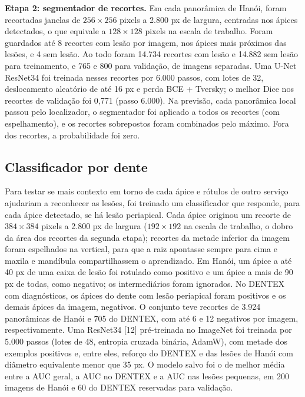 \documentclass[twocolumn]{article}
\begin{document}
\textbf{Etapa 2: segmentador de recortes.} Em cada panorâmica de Hanói, foram recortadas janelas de $256 \times 256$ pixels a 2.800 px de largura, centradas nos ápices detectados, o que equivale a $128 \times 128$ pixels na escala de trabalho. Foram guardados até 8 recortes com lesão por imagem, nos ápices mais próximos das lesões, e 4 sem lesão. Ao todo foram 14.734 recortes com lesão e 14.882 sem lesão para treinamento, e 765 e 800 para validação, de imagens separadas. Uma U-Net ResNet34 foi treinada nesses recortes por 6.000 passos, com lotes de 32, deslocamento aleatório de até 16 px e perda BCE + Tversky; o melhor Dice nos recortes de validação foi 0,771 (passo 6.000). Na previsão, cada panorâmica local passou pelo localizador, o segmentador foi aplicado a todos os recortes (com espelhamento), e os recortes sobrepostos foram combinados pelo máximo. Fora dos recortes, a probabilidade foi zero.

\subsection{Classificador por dente}

Para testar se mais contexto em torno de cada ápice e rótulos de outro serviço ajudariam a reconhecer as lesões, foi treinado um classificador que responde, para cada ápice detectado, se há lesão periapical. Cada ápice originou um recorte de $384 \times 384$ pixels a 2.800 px de largura ($192 \times 192$ na escala de trabalho, o dobro da área dos recortes da segunda etapa); recortes da metade inferior da imagem foram espelhados na vertical, para que a raiz apontasse sempre para cima e maxila e mandíbula compartilhassem o aprendizado. Em Hanói, um ápice a até 40 px de uma caixa de lesão foi rotulado como positivo e um ápice a mais de 90 px de todas, como negativo; os intermediários foram ignorados. No DENTEX com diagnósticos, os ápices do dente com lesão periapical foram positivos e os demais ápices da imagem, negativos. O conjunto teve recortes de 3.924 panorâmicas de Hanói e 705 do DENTEX, com até 6 e 12 negativos por imagem, respectivamente. Uma ResNet34 [12] pré-treinada no ImageNet foi treinada por 5.000 passos (lotes de 48, entropia cruzada binária, AdamW), com metade dos exemplos positivos e, entre eles, reforço do DENTEX e das lesões de Hanói com diâmetro equivalente menor que 35 px. O modelo salvo foi o de melhor média entre a AUC geral, a AUC no DENTEX e a AUC nas lesões pequenas, em 200 imagens de Hanói e 60 do DENTEX reservadas para validação.
\end{document}
